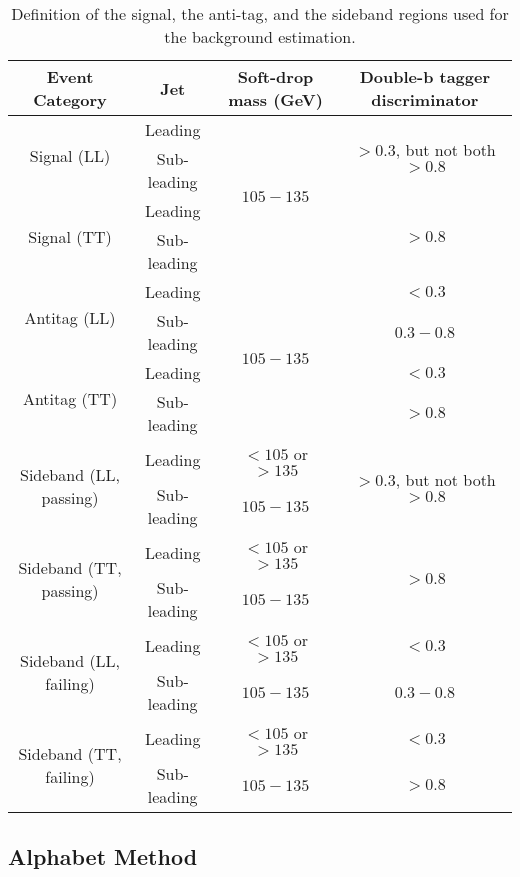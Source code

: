 \begin{table}[h!]
\begin{center}
    \begin{tabular}{c c c c}
    \hline
    \hline
    Event Category &  Jet & Soft-drop mass (GeV) & Double-b tagger discriminator  \\
    \hline
    \multirow{2}{*}{Signal (LL)} & Leading & \multirow{4}{*}{$105-135$} & \multirow{2}{*}{$>0.3$, but not both $>0.8$}\\
    & Sub-leading & & \\
    \multirow{2}{*}{Signal (TT)} & Leading & & \multirow{2}{*}{$>0.8$}\\
    & Sub-leading & & \\
    \hline
    \multirow{2}{*}{Antitag (LL)} & Leading & \multirow{4}{*}{$105-135$} & $<0.3$\\
    & Sub-leading & & $0.3-0.8$\\
    \multirow{2}{*}{Antitag (TT)} & Leading & & $<0.3$\\
    & Sub-leading & & $>0.8$\\
    \hline
    \multirow{2}{*}{Sideband (LL, passing)} & Leading & $<105$ or $>135$ &  \multirow{2}{*}{$>0.3$, but not both $>0.8$}\\
    & Sub-leading & $105-135$& \\
    \multirow{2}{*}{Sideband (TT, passing)} & Leading &$<105$ or $>135$ & \multirow{2}{*}{$>0.8$}\\
    & Sub-leading & $105-135$& \\
    \hline
    \multirow{2}{*}{Sideband (LL, failing)} & Leading & $<105$ or $>135$ & $<0.3$\\
    & Sub-leading & $105-135$& $0.3-0.8$\\
    \multirow{2}{*}{Sideband (TT, failing)} & Leading &$<105$ or $>135$ & $<0.3$\\
    & Sub-leading & $105-135$& $>0.8$\\
    \hline
    \hline
    \end{tabular}
    \caption{Definition of the signal, the anti-tag, and the sideband regions used for the background estimation.}
 \label{tab:EventCategories}
\end{center}
\end{table}

\subsection{Alphabet Method}

